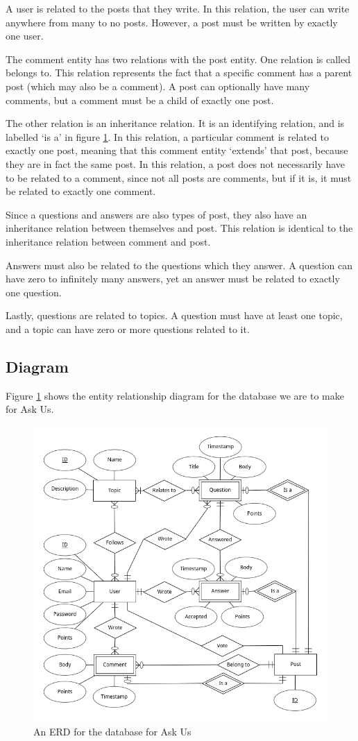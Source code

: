 A user is related to the posts that they write. In this relation, the user can write anywhere from many to no posts. However, a post must be written by exactly one user.

The comment entity has two relations with the post entity. One relation is called belongs to. This relation represents the fact that a specific comment has a parent post (which may also be a comment). A post can optionally have many comments, but a comment must be a child of exactly one post.

The other relation is an inheritance relation. It is an identifying relation, and is labelled `is a' in figure \ref{erd}. In this relation, a particular comment is related to exactly one post, meaning that this comment entity `extends' that post, because they are in fact the same post. In this relation, a post does not necessarily have to be related to a comment, since not all posts are comments, but if it is, it must be related to exactly one comment.

Since a questions and answers are also types of post, they also have an inheritance relation between themselves and post. This relation is identical to the inheritance relation between comment and post.

Answers must also be related to the questions which they answer. A question can have zero to infinitely many answers, yet an answer must be related to exactly one question.

Lastly, questions are related to topics. A question must have at least one topic, and a topic can have zero or more questions related to it.

\subsection{Diagram}

Figure \ref{erd} shows the entity relationship diagram for the database we are to make for Ask Us.

\begin{figure}[p]
	\centering
	\includegraphics[width=\linewidth]{../../ERD/erd.png}
	\caption{An ERD for the database for Ask Us}
	\label{erd}
\end{figure}